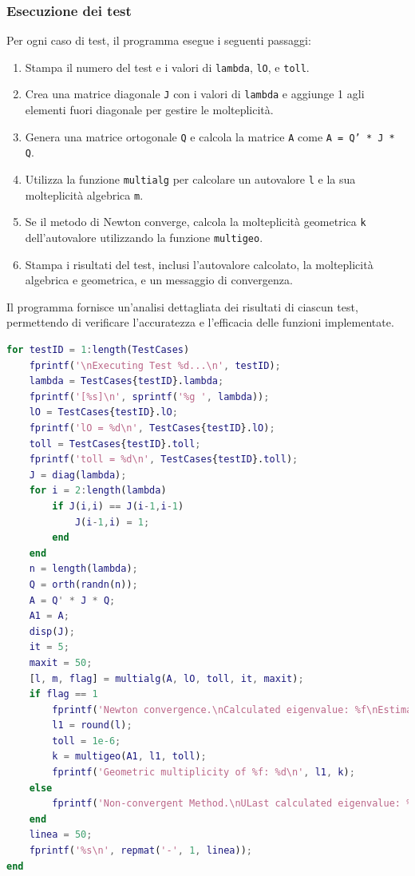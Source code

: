 \documentclass[12pt]{article}
\begin{document}
\subsubsection{Esecuzione dei test}
Per ogni caso di test, il programma esegue i seguenti passaggi:
    \begin{enumerate}
        \item Stampa il numero del test e i valori di \texttt{lambda}, \texttt{lO}, e \texttt{toll}.
        \item Crea una matrice diagonale \texttt{J} con i valori di \texttt{lambda} e aggiunge 1 agli elementi fuori diagonale per gestire le molteplicità.
        \item Genera una matrice ortogonale \texttt{Q} e calcola la matrice \texttt{A} come \texttt{A = Q' * J * Q}.
        \item Utilizza la funzione \texttt{multialg} per calcolare un autovalore \texttt{l} e la sua molteplicità algebrica \texttt{m}.
        \item Se il metodo di Newton converge, calcola la molteplicità geometrica \texttt{k} dell'autovalore utilizzando la funzione \texttt{multigeo}.
        \item Stampa i risultati del test, inclusi l'autovalore calcolato, la molteplicità algebrica e geometrica, e un messaggio di convergenza.
    \end{enumerate}
    Il programma fornisce un'analisi dettagliata dei risultati di ciascun test, permettendo di verificare l'accuratezza e l'efficacia delle funzioni implementate.
    \newpage
\begin{lstlisting}[language=Matlab, frame=single, caption={Esecuzione dei test}, captionpos=b]
for testID = 1:length(TestCases)
    fprintf('\nExecuting Test %d...\n', testID);    
    lambda = TestCases{testID}.lambda;
    fprintf('[%s]\n', sprintf('%g ', lambda));
    lO = TestCases{testID}.lO;
    fprintf('lO = %d\n', TestCases{testID}.lO);
    toll = TestCases{testID}.toll;
    fprintf('toll = %d\n', TestCases{testID}.toll);
    J = diag(lambda);
    for i = 2:length(lambda)
        if J(i,i) == J(i-1,i-1)
            J(i-1,i) = 1;
        end
    end
    n = length(lambda);
    Q = orth(randn(n)); 
    A = Q' * J * Q;
    A1 = A;
    disp(J);     
    it = 5;
    maxit = 50;
    [l, m, flag] = multialg(A, lO, toll, it, maxit);
    if flag == 1
        fprintf('Newton convergence.\nCalculated eigenvalue: %f\nEstimated algebraic multiplicity: %d\n', l, m);
        l1 = round(l);
        toll = 1e-6;
        k = multigeo(A1, l1, toll);
        fprintf('Geometric multiplicity of %f: %d\n', l1, k);
    else
        fprintf('Non-convergent Method.\nULast calculated eigenvalue: %f\nEstimated algebraic multiplicity: %d\n', l, m);
    end
    linea = 50;
    fprintf('%s\n', repmat('-', 1, linea));
end
\end{lstlisting}
\newpage
\end{document}
